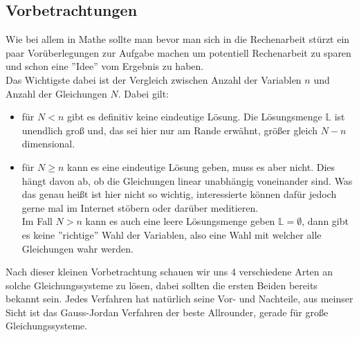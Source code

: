 \documentclass[a4paper,12pt]{article}
\newcommand{\Redbox}[1]{
	{
		\vspace*{0.1cm}
		\begin{tcolorbox}[breakable,colback=yellow!0,colframe=red!65!black,width=\linewidth ]
			{#1}
		\end{tcolorbox}
		
		
	}
}
\begin{document}
	\subsection{Vorbetrachtungen}
	Wie bei allem in Mathe sollte man bevor man sich in die Rechenarbeit stürzt ein paar Vorüberlegungen zur Aufgabe machen um potentiell Rechenarbeit zu sparen und schon eine ''Idee'' vom Ergebnis zu haben.\\
	Das Wichtigste dabei ist der Vergleich zwischen Anzahl der Variablen $n$ und Anzahl der Gleichungen $N$. Dabei gilt:
	\Redbox{\begin{itemize}
			\item für $N<n$ gibt es definitiv keine eindeutige Lösung. Die Lösungsmenge $\mathds{L}$ ist unendlich groß und, das sei hier nur am Rande erwähnt, größer gleich $ N-n$ dimensional.
			\item für $N\geq n$ kann es eine eindeutige Lösung geben, muss es aber nicht. Dies hängt davon ab, ob die Gleichungen linear unabhängig voneinander sind. Was das genau heißt ist hier nicht so wichtig, interessierte können dafür jedoch gerne mal im Internet stöbern oder darüber meditieren. \\
			Im Fall $N > n$ kann es auch eine leere Lösungsmenge geben $\mathds{L}=\emptyset$, dann gibt es keine ''richtige'' Wahl der Variablen, also eine Wahl mit welcher alle Gleichungen wahr werden. 
	\end{itemize}}
	Nach dieser kleinen Vorbetrachtung schauen wir uns 4 verschiedene Arten an solche Gleichungssysteme zu lösen, dabei sollten die ersten Beiden bereits bekannt sein. Jedes Verfahren hat natürlich seine Vor- und Nachteile, aus meinser Sicht ist das Gauss-Jordan Verfahren der beste Allrounder, gerade für große Gleichungssysteme.
\end{document}

